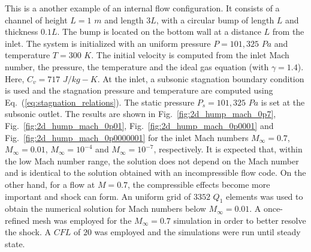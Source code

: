 \documentclass[preprint,10pt]{elsarticle}
\newcommand{\eqt}[1]{Eq.~(\ref{#1})}                     %
\newcommand{\fig}[1]{Fig.~\ref{#1}}                      %
\begin{document}
This is a another example of an internal flow configuration. It consists of a channel of height $L=1$ $m$ and length $3L$, with a circular bump of length $L$ and thickness $0.1L$. The bump is located on the bottom wall at a distance $L$ from the inlet. The system is initialized with an uniform pressure $P=101,325$ $Pa$ and temperature $T=300$ $K$. The initial velocity is computed from the inlet Mach number, the pressure, the temperature and the ideal gas equation (with  $\gamma=1.4$). Here,  $C_v = 717$ $J/kg-K$. At the inlet, a subsonic stagnation boundary condition is used and the stagnation pressure and temperature are computed using \eqt{eq:stagnation_relations}.
The static pressure $P_s = 101,325$ $Pa$ is set at the subsonic outlet. The results are shown in \fig{fig:2d_hump_mach_0p7}, \fig{fig:2d_hump_mach_0p01}, \fig{fig:2d_hump_mach_0p0001} and \fig{fig:2d_hump_mach_0p0000001} for the inlet Mach numbers $M_{\infty}=0.7$, $M_{\infty}=0.01$, $M_{\infty}=10^{-4}$ and $M_{\infty}=10^{-7}$, respectively. It is expected that, within the low Mach number range, the solution does not depend on the Mach number and is identical to the solution obtained with an incompressible flow code. On the other hand, for a flow at $M=0.7$, the compressible effects become more important and shock can form. An uniform grid of $3352$ $Q_1$ elements was used to obtain the numerical solution for Mach numbers below $M_{\infty}=0.01$. A once-refined mesh was employed for the $M_{\infty}=0.7$ simulation in order to better resolve the shock. A $CFL$ of $20$ was employed and the simulations were run until steady state.
%
\end{document}
